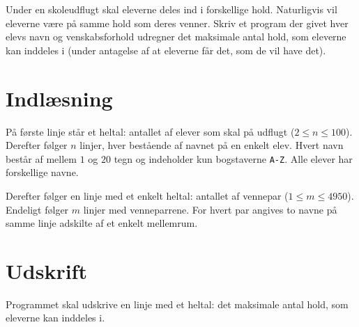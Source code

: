 
Under en skoleudflugt skal eleverne deles ind i forskellige hold.
Naturligvis vil eleverne være på samme hold som deres venner.
Skriv et program der givet hver elevs navn og venskabsforhold udregner det maksimale antal hold, som eleverne kan inddeles i (under antagelse af at eleverne får det, som de vil have det).

\section*{Indlæsning}

På første linje står et heltal: antallet af elever som skal på udflugt ($2 \le n \le 100$).
Derefter følger $n$ linjer, hver bestående af navnet på en enkelt elev.
Hvert navn består af mellem $1$ og $20$ tegn og indeholder kun bogstaverne \texttt{A-Z}.
Alle elever har forskellige navne.

Derefter følger en linje med et enkelt heltal: antallet af vennepar ($1 \le m \le 4950$).
Endeligt følger $m$ linjer med venneparrene.
For hvert par angives to navne på samme linje adskilte af et enkelt mellemrum.

\section*{Udskrift}
Programmet skal udskrive en linje med et heltal: det maksimale antal hold, som eleverne kan inddeles i.
